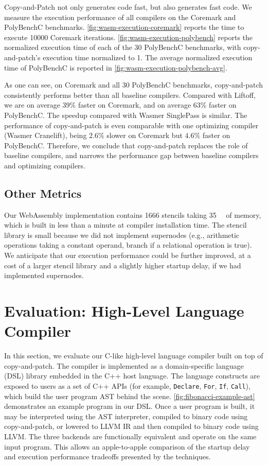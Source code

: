 \documentclass[acmsmall,nonacm,screen]{acmart}\settopmatter{printfolios=true,printccs=true,printacmref=false}
\newcommand{\figref}[1]{\autoref{#1}}
\newcommand\code[1]{\lstinline[mathescape=true,basicstyle=\ttfamily\normalsize]|#1|}
\newcommand{\cp}{copy-and-patch}
\newcommand{\cpcap}{Copy-and-Patch}
\newcommand{\wasmStencilNum}{\num{1666}}%
\newcommand{\wasmStencilSize}{\SI{35}{\kilo\byte}}%
\begin{document}
\cpcap{} not only generates code fast, but also generates fast code. We measure the execution performance of all compilers on the Coremark and PolyBenchC benchmarks.
\figref{fig:wasm-execution-coremark} reports the time to execute 10000 Coremark iterations. \figref{fig:wasm-execution-polybench} reports the normalized execution time of each of the 30 PolyBenchC benchmarks, with \cp{}'s execution time normalized to 1. The average normalized execution time of PolyBenchC is reported in \figref{fig:wasm-execution-polybench-avg}.

As one can see, on Coremark and all 30 PolyBenchC benchmarks, \cp{} consistently performs better than all baseline compilers. Compared with Liftoff, we are on average $39\%$ faster on Coremark, and on average $63\%$ faster on PolyBenchC. 
The speedup compared with Wasmer SinglePass is similar. The performance of \cp{} is even comparable with one optimizing compiler (Wasmer Cranelift), being $2.6\%$ slower on Coremark but $4.6\%$ faster on PolyBenchC. 
Therefore, we conclude that \cp{} replaces the role of baseline compilers, and narrows the performance gap between baseline compilers and optimizing compilers. 


\subsection{Other Metrics}

Our WebAssembly implementation contains \wasmStencilNum{} stencils taking \wasmStencilSize{} of memory, which is built in less than a minute at compiler installation time. The stencil library is small because we did not implement supernodes (e.g., arithmetic operations taking a constant operand, branch if a relational operation is true). We anticipate that our execution performance could be further improved, at a cost of a larger stencil library and a slightly higher startup delay, if we had implemented supernodes.


\section{Evaluation: High-Level Language Compiler}
\label{sec:evaluation}

In this section, we evaluate our C-like high-level language compiler built on top of copy-and-patch. The compiler is implemented as a domain-specific language (DSL) library embedded in the C++ host language. The language constructs are exposed to users as a set of C++ APIs (for example, \code{Declare}, \code{For}, \code{If}, \code{Call}), which build the user program AST behind the scene. \figref{fig:fibonacci-example-ast} demonstrates an example program in our DSL. Once a user program is built, it may be interpreted using the AST interpreter, compiled to binary code using \cp{}, or lowered to LLVM IR and then compiled to binary code using LLVM. The three backends are functionally equivalent and operate on the same input program. This allows an apple-to-apple comparison of the startup delay and execution performance tradeoffs presented by the techniques.
\end{document}
